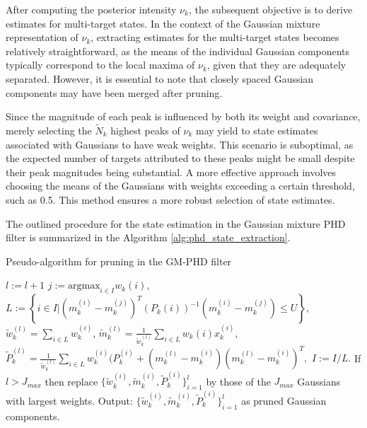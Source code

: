 After computing the posterior intensity $\nu_k$, the subsequent objective is to derive estimates for multi-target states. In the context of the Gaussian mixture representation of $\nu_k$, extracting estimates for the multi-target states becomes relatively straightforward, as the means of the individual Gaussian components typically correspond to the local maxima of $\nu_k$, given that they are adequately separated. However, it is essential to note that closely spaced Gaussian components may have been merged after pruning.

Since the magnitude of each peak is influenced by both its weight and covariance, merely selecting the $\tilde{N}_k$ highest peaks of $\nu_k$ may yield to state estimates associated with Gaussians to have weak weights. This scenario is suboptimal, as the expected number of targets attributed to these peaks might be small despite their peak magnitudes being substantial. A more effective approach involves choosing the means of the Gaussians with weights exceeding a certain threshold, such as 0.5. This method ensures a more robust selection of state estimates.

The outlined procedure for the state estimation in the Gaussian mixture PHD filter is summarized in the Algorithm \ref{alg:phd_state_extraction}.

\begin{algorithm}
    \caption{Pseudo-algorithm for pruning in the GM-PHD filter}
    \begin{algorithmic}[1]
            \State $l:= l+1$
            \State $j:= \text{argmax}_{i \in I} w_k{(i)},$
            \State $L:= \left\{ i \in I | (m_k^{(i)} - m_k^{(j)})^T (P_k{(i)})^{-1} (m_k^{(i)} - m_k^{(j)}) \leq U \right\},$
            \State $\tilde{w}_k^{(l)} = \sum_{i \in L} w_k^{(i)}$,
            \State $\tilde{m}_k^{(l)} = \frac{1}{\tilde{w}_k^{(l)}} \sum_{i \in L} w_k{(i)} x_k^{(i)},$
            \State $\tilde{P}_k^{(l)} = \frac{1}{\tilde{w}_k^{(l)}} \sum_{i \in L} w_k^{(i)} (P_k^{(i)} + (m_k^{(l)} - m _k^{(i)}) (m_k^{(l)} - m _k^{(i)})^T,$
            \State $I:= I/L.$
        \EndWhile
        \EndProcedure
        \State
        \State If $l > J_{max}$ then replace $\{ \tilde{w}_k^{(i)}, \tilde{m}_k^{(i)}, \tilde{P}_k^{(i)} \}_{i=1}^l$
        by those of the $J_{max}$ Gaussians with largest weights.
        \State
        \State Output: $\{ \tilde{w}_k^{(i)}, \tilde{m}_k^{(i)}, \tilde{P}_k^{(i)} \}_{i=1}^l$ as pruned Gaussian components.

    \end{algorithmic}
    \label{alg:phd_merging}
\end{algorithm}

